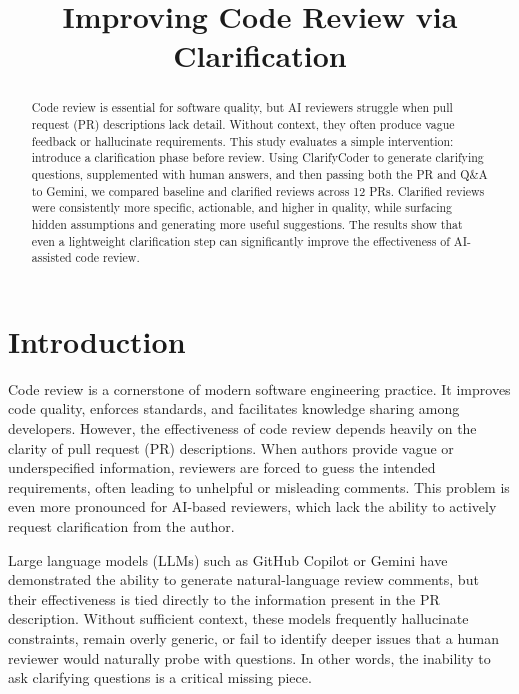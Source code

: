 \documentclass[conference]{IEEEtran}
\begin{document}
\title{Improving Code Review via Clarification}
\author{
}
\maketitle

\begin{abstract}
    Code review is essential for software quality, but AI reviewers struggle when pull request (PR) descriptions lack detail. Without context, they often produce vague feedback or hallucinate requirements. This study evaluates a simple intervention: introduce a clarification phase before review. Using ClarifyCoder to generate clarifying questions, supplemented with human answers, and then passing both the PR and Q\&A to Gemini, we compared baseline and clarified reviews across 12 PRs. Clarified reviews were consistently more specific, actionable, and higher in quality, while surfacing hidden assumptions and generating more useful suggestions. The results show that even a lightweight clarification step can significantly improve the effectiveness of AI-assisted code review.
\end{abstract}

\section{Introduction}
Code review is a cornerstone of modern software engineering practice. It improves code quality, enforces standards, and facilitates knowledge sharing among developers. However, the effectiveness of code review depends heavily on the clarity of pull request (PR) descriptions. When authors provide vague or underspecified information, reviewers are forced to guess the intended requirements, often leading to unhelpful or misleading comments. This problem is even more pronounced for AI-based reviewers, which lack the ability to actively request clarification from the author.

Large language models (LLMs) such as GitHub Copilot or Gemini have demonstrated the ability to generate natural-language review comments, but their effectiveness is tied directly to the information present in the PR description. Without sufficient context, these models frequently hallucinate constraints, remain overly generic, or fail to identify deeper issues that a human reviewer would naturally probe with questions. In other words, the inability to ask clarifying questions is a critical missing piece.
\end{document}
